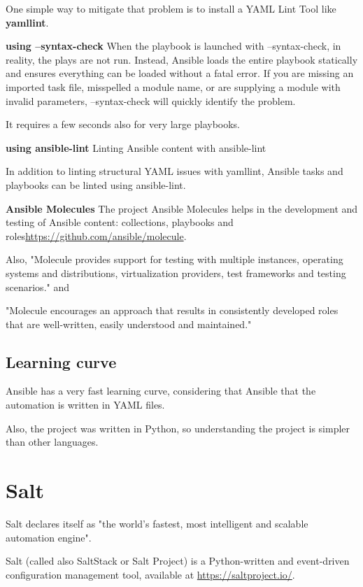 \documentclass[12pt,a4paper,openright,twoside]{book}
\begin{document}
One simple way to mitigate that problem is to install a YAML Lint Tool like \textbf{yamllint}.

\textbf{using --syntax-check}
When the playbook is launched with --syntax-check, in reality, the plays are not run. Instead, Ansible loads the entire playbook statically and ensures everything can be loaded without a fatal error. If you are missing an imported task file, misspelled a module name, or are supplying a module with invalid parameters, --syntax-check will quickly identify the problem.


It requires a few seconds also for very large playbooks.

\textbf{using ansible-lint}
Linting Ansible content with ansible-lint


In addition to linting structural YAML issues with yamllint, Ansible tasks and playbooks can be linted using ansible-lint.

\textbf{Ansible Molecules}
The project Ansible Molecules helps in the development and testing of Ansible content: collections, playbooks and roles\url{https://github.com/ansible/molecule}.


Also, "Molecule provides support for testing with multiple instances, operating systems and distributions, virtualization providers, test frameworks and testing scenarios." and 


"Molecule encourages an approach that results in consistently developed roles that are well-written, easily understood and maintained."\cite{ansibleMolecule}

\section{Learning curve}
Ansible has a very fast learning curve, considering that Ansible that the automation is written in YAML files.


Also, the project was written in Python, so understanding the project is simpler than other languages.

\chapter{Salt}
Salt declares itself as "the world's fastest, most intelligent and scalable automation engine"\cite{saltDocAbout}.


Salt (called also SaltStack or Salt Project) is a Python-written and event-driven configuration management tool, available at \url{https://saltproject.io/}.
\end{document}
